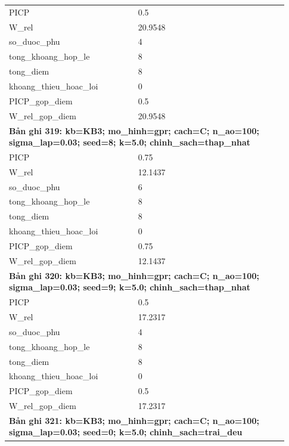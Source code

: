 \begin{longtable}{p{0.43\linewidth}p{0.50\linewidth}}
PICP & 0.5 \\
W\_\allowbreak rel & 20.9548 \\
so\_\allowbreak duoc\_\allowbreak phu & 4 \\
tong\_\allowbreak khoang\_\allowbreak hop\_\allowbreak le & 8 \\
tong\_\allowbreak diem & 8 \\
khoang\_\allowbreak thieu\_\allowbreak hoac\_\allowbreak loi & 0 \\
PICP\_\allowbreak gop\_\allowbreak diem & 0.5 \\
W\_\allowbreak rel\_\allowbreak gop\_\allowbreak diem & 20.9548 \\
\midrule
\multicolumn{2}{p{0.95\linewidth}}{\textbf{Bản ghi 319: kb=KB3; mo\_hinh=gpr; cach=C; n\_ao=100; sigma\_lap=0.03; seed=8; k=5.0; chinh\_sach=thap\_nhat}} \\
PICP & 0.75 \\
W\_\allowbreak rel & 12.1437 \\
so\_\allowbreak duoc\_\allowbreak phu & 6 \\
tong\_\allowbreak khoang\_\allowbreak hop\_\allowbreak le & 8 \\
tong\_\allowbreak diem & 8 \\
khoang\_\allowbreak thieu\_\allowbreak hoac\_\allowbreak loi & 0 \\
PICP\_\allowbreak gop\_\allowbreak diem & 0.75 \\
W\_\allowbreak rel\_\allowbreak gop\_\allowbreak diem & 12.1437 \\
\midrule
\multicolumn{2}{p{0.95\linewidth}}{\textbf{Bản ghi 320: kb=KB3; mo\_hinh=gpr; cach=C; n\_ao=100; sigma\_lap=0.03; seed=9; k=5.0; chinh\_sach=thap\_nhat}} \\
PICP & 0.5 \\
W\_\allowbreak rel & 17.2317 \\
so\_\allowbreak duoc\_\allowbreak phu & 4 \\
tong\_\allowbreak khoang\_\allowbreak hop\_\allowbreak le & 8 \\
tong\_\allowbreak diem & 8 \\
khoang\_\allowbreak thieu\_\allowbreak hoac\_\allowbreak loi & 0 \\
PICP\_\allowbreak gop\_\allowbreak diem & 0.5 \\
W\_\allowbreak rel\_\allowbreak gop\_\allowbreak diem & 17.2317 \\
\midrule
\multicolumn{2}{p{0.95\linewidth}}{\textbf{Bản ghi 321: kb=KB3; mo\_hinh=gpr; cach=C; n\_ao=100; sigma\_lap=0.03; seed=0; k=5.0; chinh\_sach=trai\_deu}} \\

\end{longtable}
